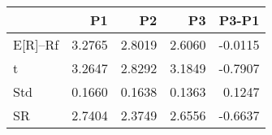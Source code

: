 \begin{tabular}{lrrrr}
\toprule
 & P1 & P2 & P3 & P3-P1 \\
\midrule
E[R]--Rf & 3.2765 & 2.8019 & 2.6060 & -0.0115 \\
t & 3.2647 & 2.8292 & 3.1849 & -0.7907 \\
Std & 0.1660 & 0.1638 & 0.1363 & 0.1247 \\
SR & 2.7404 & 2.3749 & 2.6556 & -0.6637 \\
\bottomrule
\end{tabular}
